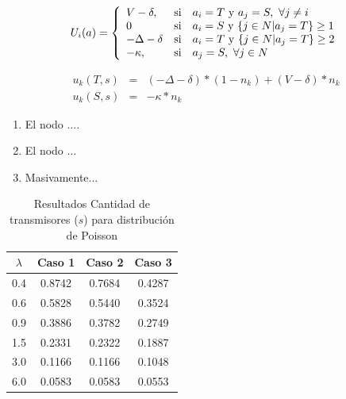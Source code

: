 \documentclass[journal]{IEEEtran}
\begin{document}
\begin{equation}
U_i(a) = \left\lbrace
\begin{array}{lll}
V - \delta, &\textup{si}& a_i = T \textup{ y } a_j=S, \textup{   } \forall j\not= i\\
0 & \textup{si}& a_i =S \textup{ y } \lbrace j \in N | a_j=T\rbrace \geq 1\\
-\Delta - \delta & \textup{si}& a_i=T \textup{ y } \lbrace j \in N | a_j=T\rbrace \geq 2\\
-\kappa, &\textup{si}& a_j = S, \textup{     } \forall j \in N\\
\end{array}
\right.
\label{equ:payofffunction}
\end{equation}


\begin{eqnarray}
u_k(T,s) & = & (-\Delta-\delta)*(1-n_k)+(V-\delta)*n_k\label{eq:payoffT}\\
u_k(S,s) & = & -\kappa *n_k \label{eq:payoffS}
\end{eqnarray}

\begin{enumerate}
\item El nodo ....
\item El nodo ...
\item Masivamente...
\end{enumerate}




\begin{table}[]
\centering
\caption{Resultados Cantidad de transmisores ($s$) para distribución de Poisson}
\label{REsultadosJA}
\begin{tabular}{|c|c c c|}
\hline
\textbf{$\lambda$} & \textbf{Caso 1} & \textbf{Caso 2} & \textbf{Caso 3}         \\ \hline
        \hline
0.4 & 0.8742 & 0.7684 & 0.4287 \\
0.6 & 0.5828 & 0.5440 & 0.3524 \\
0.9 & 0.3886 & 0.3782 & 0.2749 \\
1.5 & 0.2331 & 0.2322 & 0.1887 \\
3.0 & 0.1166 & 0.1166 & 0.1048 \\
6.0 & 0.0583 & 0.0583 & 0.0553 \\
\hline
\end{tabular}
\end{table}
\end{document}
